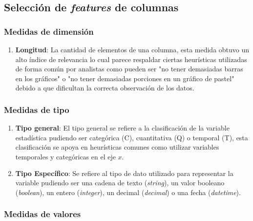 \documentclass[a4paper,10pt,twocolumn]{article}
\begin{document}
	\subsection{Selecci\'on de \textit{features} de columnas}


	\subsubsection*{Medidas de dimensi\'on}
		\begin{enumerate}
			\item \textbf{Longitud}: La cantidad de elementos de una columna, esta medida obtuvo un
			alto \'indice de relevancia lo cual parece respaldar ciertas heur\'isticas 
			utilizadas de forma com\'un por analistas como pueden ser "no tener demasiadas barras en los gr\'aficos"
			o "no tener demasiadas porciones en un gr\'afico de pastel" debido a que dificultan
			la correcta observaci\'on de los datos.
		\end{enumerate} 

	\subsubsection*{Medidas de tipo}
		\begin{enumerate}
			\item \textbf{Tipo general}: El tipo general se refiere a la clasificaci\'on de la variable estad\'istica
			pudiendo ser categ\'orica (C), cuantitativa (Q) o temporal (T), esta clasificaci\'on se apoya en
			heur\'isticas comunes como utilizar variables temporales y categ\'oricas en el eje $x$.
			\item \textbf{Tipo Espec\'ifico}: Se refiere al tipo de dato utilizado para representar la variable pudiendo
			ser una cadena de texto (\textit{string}), un valor booleano (\textit{boolean}), un entero (\textit{integer}), 
			un decimal (\textit{decimal}) o una fecha (\textit{datetime}).
		\end{enumerate}
	
	\subsubsection*{Medidas de valores}
\end{document}
